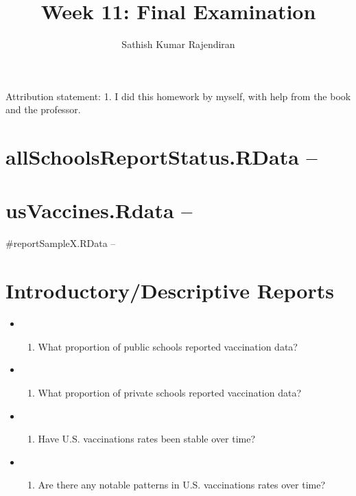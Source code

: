 \documentclass[]{article}
\title{Week 11: Final Examination}
\author{Sathish Kumar Rajendiran}
\date{}
\providecommand{\tightlist}{%
  \setlength{\itemsep}{0pt}\setlength{\parskip}{0pt}}
\begin{document}
\maketitle

Attribution statement: 1. I did this homework by myself, with help from
the book and the professor.

\hypertarget{allschoolsreportstatus.rdata}{%
\section{allSchoolsReportStatus.RData
--}\label{allschoolsreportstatus.rdata}}

\hypertarget{usvaccines.rdata}{%
\section{usVaccines.Rdata --}\label{usvaccines.rdata}}

\#reportSampleX.RData --

\hypertarget{introductorydescriptive-reports}{%
\section{Introductory/Descriptive
Reports}\label{introductorydescriptive-reports}}

\begin{itemize}
\item
  \begin{enumerate}
  \def\labelenumi{\arabic{enumi}.}
  \tightlist
  \item
    What proportion of public schools reported vaccination data?
  \end{enumerate}
\item
  \begin{enumerate}
  \def\labelenumi{\arabic{enumi}.}
  \setcounter{enumi}{1}
  \tightlist
  \item
    What proportion of private schools reported vaccination data?
  \end{enumerate}
\item
  \begin{enumerate}
  \def\labelenumi{\arabic{enumi}.}
  \setcounter{enumi}{2}
  \tightlist
  \item
    Have U.S. vaccinations rates been stable over time?
  \end{enumerate}
\item
  \begin{enumerate}
  \def\labelenumi{\arabic{enumi}.}
  \setcounter{enumi}{3}
  \tightlist
  \item
    Are there any notable patterns in U.S. vaccinations rates over time?
  \end{enumerate}
\end{itemize}
\end{document}
